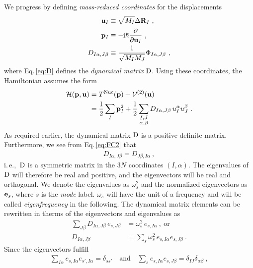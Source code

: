 We progress by defining \emph{mass-reduced coordinates} for the displacements
\begin{align}
	{\bf u}_I 
		&\equiv \sqrt{M_I} \Delta {\bf R}_I~, 
		\label{eq:uI} \\
	{\bf p}_I 
		&\equiv -{\rm i} \hbar \frac{\partial}{\partial {\bf u}_I}~,
		\label{eq:pI} \\
	D_{I \alpha, J \beta}
		&\equiv \frac{1}{\sqrt{M_I M_J}} 
		\Phi_{I \alpha, J \beta}~,
		\label{eq:D}
\end{align}
where Eq.\,\eqref{eq:D} defines the \emph{dynamical matrix} $\rm D$.
Using these coordinates, the Hamiltonian assumes the form
\begin{align}
	\begin{split}
		\mathcal{H}({\bf p}, {\bf u})
			&= T^{\rm Nuc} ({\bf p}) + \mathcal{V}^{(2)} ({\bf u})\\
			&= \frac{1}{2} \sum_I {\bf p}_I^2 + 
				\frac{1}{2} \sum_{\substack{I, J \\ \alpha, \beta}}
					D_{I \alpha, J \beta}
					\, u_I^\alpha u_J^\beta~.
	\end{split}
	\label{eq:ha.H1}
\end{align}
As required earlier, the dynamical matrix $\rm D$ is a positive definite matrix. Furthermore, we see from Eq.\,\eqref{eq:FC2} that
\begin{align}
	D_{I \alpha, J \beta} = D_{J \beta, I \alpha}~,
	\label{eq:D.symmetric}
\end{align}
i.\,e.,~$\rm D$ is a symmetric matrix in the $3N$ coordinates $(I, \alpha)$. The eigenvalues of $\rm D$ will therefore be real and positive, and the eigenvectors will be real and orthogonal. We denote the eigenvalues as $\omega_s^2$ and the normalized eigenvectors as ${\bf e}_s$, where $s$ is the \emph{mode} label. $\omega_s$ will have the unit of a frequency and  will be called \emph{eigenfrequency} in the following. The dynamical matrix elements can be rewritten in therms of the eigenvectors and eigenvalues as
\begin{align}
	\sum_{J \beta}
		D_{I \alpha, J \beta} \, e_{s, J \beta} 
			&= \omega^2_s \, e_{s, I \alpha}~,~\text{or} 
			\label{eq:sum_D_IJ} \\
		D_{I \alpha, J \beta}
			&= \sum_s \omega^2_s \, e_{s, I \alpha} e_{s, J \beta}~.
			\label{eq:D_IJs}
\end{align}
Since the eigenvectors fulfill
\begin{align}
	\sum_{I \alpha} e_{s, I \alpha} e_{s', I \alpha} = \delta_{s s'}
	\quad \text{and} \quad
	\sum_{s} e_{s, I \alpha} e_{s, J \beta} = \delta_{IJ} \delta_{\alpha \beta}~,
\end{align}

